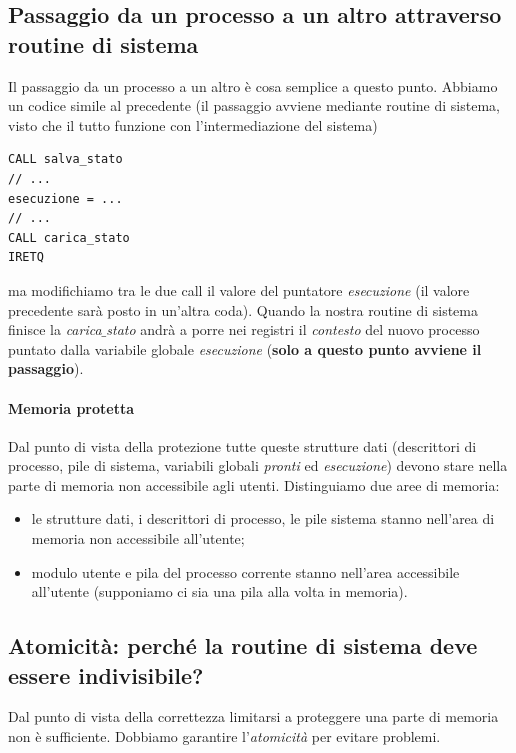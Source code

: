 \documentclass[11pt]{report}
\theoremstyle{definition}
\begin{document}
\subsection{Passaggio da un processo a un altro attraverso routine di sistema} Il passaggio da un processo a un altro è cosa semplice a questo punto. Abbiamo un codice simile al precedente (il passaggio avviene mediante routine di sistema, visto che il tutto funzione con l'intermediazione del sistema)
\begin{verbatim}
CALL salva_stato
// ...
esecuzione = ...
// ...
CALL carica_stato
IRETQ
\end{verbatim}
ma modifichiamo tra le due call il valore del puntatore \emph{esecuzione} (il valore precedente sarà posto in un'altra coda). Quando la nostra routine di sistema finisce la \emph{carica$\_$stato}  andrà a porre nei registri il \emph{contesto} del nuovo processo puntato dalla variabile globale \emph{esecuzione} (\textbf{solo a questo punto avviene il passaggio}).

\paragraph{Memoria protetta} Dal punto di vista della protezione tutte queste strutture dati (descrittori di processo, pile di sistema, variabili globali \emph{pronti} ed \emph{esecuzione}) devono stare nella parte di memoria non accessibile agli utenti. Distinguiamo due aree di memoria:
\begin{itemize}
	\item le strutture dati, i descrittori di processo, le pile sistema stanno nell'area di memoria non accessibile all'utente;
	\item modulo utente e pila del processo corrente stanno nell'area accessibile all'utente (supponiamo ci sia una pila alla volta in memoria).
\end{itemize}

\subsection{Atomicità: perché la routine di sistema deve essere indivisibile?} 
Dal punto di vista della correttezza limitarsi a proteggere una parte di memoria non è sufficiente. Dobbiamo garantire l'\emph{atomicità} per evitare problemi.
\end{document}
